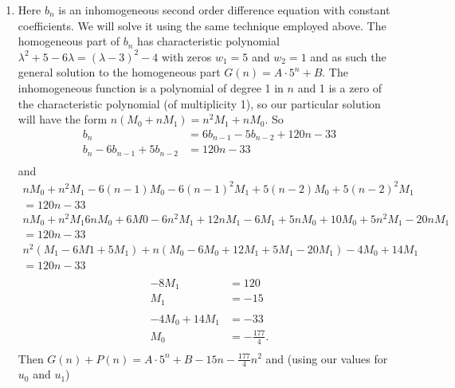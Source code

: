 \documentclass[10pt]{article}
\begin{document}
\begin{enumerate}
\begin{enumerate}
            \item Here $b_n$ is an inhomogeneous second order difference
                equation with constant coefficients. We will solve it using the
                same technique employed above. The homogeneous part of $b_n$ has
                characteristic polynomial $\lambda^2 + 5 - 6\lambda = (\lambda - 3)^2 - 4$
                with zeros $w_1 = 5$ and $w_2 = 1$ and as such the general
                solution to the homogeneous part $G(n) = A\cdot5^n + B$.
                The inhomogeneous function is a polynomial of degree 1 in $n$
                and 1 is a zero of the characteristic polynomial (of
                multiplicity 1), so our particular solution will have the form
                $n(M_0 + nM_1) = n^2M_1 + nM_0$. So
                \begin{align*}
                    b_n &= 6b_{n - 1} -  5b_{n - 2} +120n - 33 \\
                    b_n - 6b_{n - 1} + 5b_{n - 2} &= 120n - 33 \\
                \end{align*}
                and
                \begin{align*}
                    nM_0 + n^2M_1 - 6(n - 1)M_0 - 6(n - 1)^2M_1 + 5(n - 2)M_0 + 5(n - 2)^2M_1 \\ = 120n - 33 \\
                    nM_0 + n^2M_1 6nM_0 + 6M0 - 6n^2M_1 + 12nM_1 - 6M_1 + 5nM_0 + 10M_0 + 5n^2M_1 - 20nM_1 \\ = 120n - 33 \\
                    n^2(M_1 - 6M1 + 5M_1) + n(M_0 - 6M_0 + 12M_1 + 5M_1 - 20M_1) - 4M_0 + 14M_1 \\ = 120n - 33 \\
                \end{align*}
                \begin{align*}
                    -8M_1 &= 120 \\
                    M_1 &= -15 \\
                    \\
                    -4M_0 + 14M_1 &= - 33 \\
                    M_0 &= - \tfrac{177}{4}. \\
                \end{align*}
                Then $G(n) + P(n) = A\cdot5^n + B -15n - \tfrac{177}{4}n^2$ and (using our values for $u_0$ and $u_1$)
                \begin{align*}

\end{align*}
\end{enumerate}
\end{enumerate}
\end{document}
